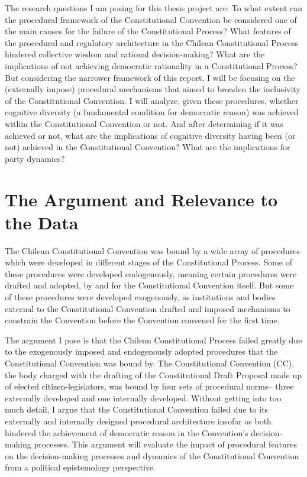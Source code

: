 \documentclass[
]{article}
\begin{document}
The research questions I am posing for this thesis project are: To what
extent can the procedural framework of the Constitutional Convention be
considered one of the main causes for the failure of the Constitutional
Process? What features of the procedural and regulatory architecture in
the Chilean Constitutional Process hindered collective wisdom and
rational decision-making? What are the implications of not achieving
democratic rationality in a Constitutional Process? But considering the
narrower framework of this report, I will be focusing on the (externally
impose) procedural mechanisms that aimed to broaden the inclusivity of
the Constitutional Convention. I will analyze, given these procedures,
whether cognitive diversity (a fundamental condition for democratic
reason) was achieved within the Constitutional Convention or not. And
after determining if it was achieved or not, what are the implications
of cognitive diversity having been (or not) achieved in the
Constitutional Convention? What are the implications for party dynamics?

\hypertarget{the-argument-and-relevance-to-the-data}{%
\section{The Argument and Relevance to the
Data}\label{the-argument-and-relevance-to-the-data}}

The Chilean Constitutional Convention was bound by a wide array of
procedures which were developed in different stages of the
Constitutional Process. Some of these procedures were developed
endogenously, meaning certain procedures were drafted and adopted, by
and for the Constitutional Convention itself. But some of these
procedures were developed exogenously, as institutions and bodies
external to the Constitutional Convention drafted and imposed mechanisms
to constrain the Convention before the Convention convened for the first
time.

The argument I pose is that the Chilean Constitutional Process failed
greatly due to the exogenously imposed and endogenously adopted
procedures that the Constitutional Convention was bound by. The
Constitutional Convention (CC), the body charged with the drafting of
the Constitutional Draft Proposal made up of elected
citizen-legislators, was bound by four sets of procedural norms-- three
externally developed and one internally developed. Without getting into
too much detail, I argue that the Constitutional Convention failed due
to its externally and internally designed procedural architecture
insofar as both hindered the achievement of democratic reason in the
Convention's decision-making processes. This argument will evaluate the
impact of procedural features on the decision-making processes and
dynamics of the Constitutional Convention from a political epistemology
perspective.
\end{document}
